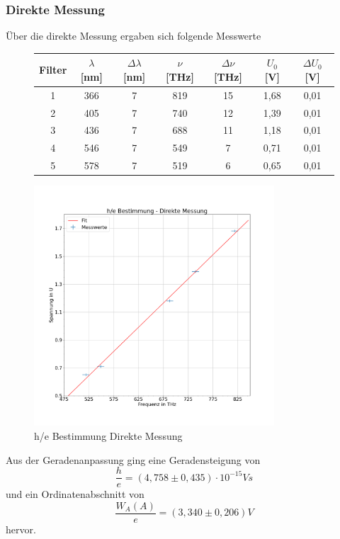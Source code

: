 \documentclass{scrartcl}
\begin{document}
		\subsubsection{Direkte Messung}
			Über die direkte Messung ergaben sich folgende Messwerte 
			\begin{figure}[H]
				\centering
				\begin{tabular}{|c|c|c|c|c|c|c|}
					\hline
					Filter & $\lambda$ [nm] & $\Delta\lambda$ [nm] & $\nu$ [THz] & $\Delta\nu$ [THz] & $U_0$ [V] & $\Delta U_0$ [V] \\
					\hline
					1 & 366 & 7 & 819 & 15 & 1,68 & 0,01\\
					2 & 405 & 7 & 740 & 12 & 1,39 & 0,01\\ 
					3 & 436 & 7 & 688 & 11 & 1,18 & 0,01\\
					4 & 546 & 7 & 549 & 7 & 0,71 & 0,01\\
					5 & 578 & 7 & 519 & 6 & 0,65 & 0,01\\
					\hline
				\end{tabular}
			\end{figure}
			\begin{figure}[H]
				\centering
				\includegraphics[width=0.8\textwidth]{he_direkt.png}
				\caption{h/e Bestimmung Direkte Messung}
			\end{figure}
			Aus der Geradenanpassung ging eine Geradensteigung von 
			\begin{equation}
				\frac{h}{e}= (4,758\pm 0,435)\cdot 10^{-15}V s
			\end{equation}
			und ein Ordinatenabschnitt von
			\begin{equation}
				\frac{W_A(A)}{e} = (3,340\pm 0,206)V
			\end{equation}
			hervor.
\end{document}
